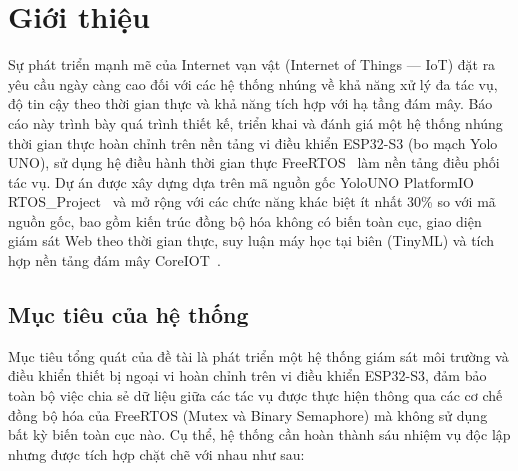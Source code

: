 \section{Giới thiệu}

Sự phát triển mạnh mẽ của Internet vạn vật (Internet of Things --- IoT) đặt ra yêu cầu ngày càng cao đối với các hệ thống nhúng về khả năng xử lý đa tác vụ, độ tin cậy theo thời gian thực và khả năng tích hợp với hạ tầng đám mây.
Báo cáo này trình bày quá trình thiết kế, triển khai và đánh giá một hệ thống nhúng thời gian thực hoàn chỉnh trên nền tảng vi điều khiển ESP32-S3 (bo mạch Yolo UNO), sử dụng hệ điều hành thời gian thực FreeRTOS~\cite{freertos} làm nền tảng điều phối tác vụ.
Dự án được xây dựng dựa trên mã nguồn gốc YoloUNO PlatformIO RTOS\_Project~\cite{yolouno} và mở rộng với các chức năng khác biệt ít nhất 30\% so với mã nguồn gốc, bao gồm kiến trúc đồng bộ hóa không có biến toàn cục, giao diện giám sát Web theo thời gian thực, suy luận máy học tại biên (TinyML) và tích hợp nền tảng đám mây CoreIOT~\cite{coreiot}.

\subsection{Mục tiêu của hệ thống}

Mục tiêu tổng quát của đề tài là phát triển một hệ thống giám sát môi trường và điều khiển thiết bị ngoại vi hoàn chỉnh trên vi điều khiển ESP32-S3, đảm bảo toàn bộ việc chia sẻ dữ liệu giữa các tác vụ được thực hiện thông qua các cơ chế đồng bộ hóa của FreeRTOS (Mutex và Binary Semaphore) mà không sử dụng bất kỳ biến toàn cục nào.
Cụ thể, hệ thống cần hoàn thành sáu nhiệm vụ độc lập nhưng được tích hợp chặt chẽ với nhau như sau:


